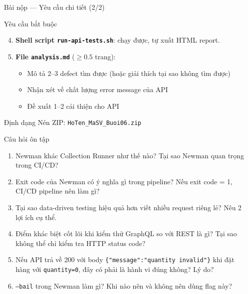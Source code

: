 \documentclass[aspectratio=169,10pt]{beamer}
\begin{document}
\begin{frame}{Bài nộp --- Yêu cầu chi tiết (2/2)}
  \begin{block}{Yêu cầu bắt buộc}
    \begin{enumerate}
      \setcounter{enumi}{3}
      \item \textbf{Shell script \texttt{run-api-tests.sh}}:
        chạy được, tự xuất HTML report.

      \item \textbf{File \texttt{analysis.md}} ($\geq 0.5$ trang):
        \begin{itemize}
          \item Mô tả 2--3 defect tìm được (hoặc giải thích tại sao không tìm được)
          \item Nhận xét về chất lượng error message của API
          \item Đề xuất 1--2 cải thiện cho API
        \end{itemize}
    \end{enumerate}
  \end{block}

  \begin{alertblock}{Định dạng}
    Nén ZIP: \texttt{HoTen\_MaSV\_Buoi06.zip}
  \end{alertblock}
\end{frame}

\begin{frame}{Câu hỏi ôn tập}
  \begin{enumerate}
    \item Newman khác Collection Runner như thế nào?
      Tại sao Newman quan trọng trong CI/CD?

    \item Exit code của Newman có ý nghĩa gì trong pipeline?
      Nếu exit code = 1, CI/CD pipeline nên làm gì?

    \item Tại sao data-driven testing hiệu quả hơn viết nhiều
      request riêng lẻ? Nêu 2 lợi ích cụ thể.

    \item Điểm khác biệt cốt lõi khi kiểm thử GraphQL so với REST
      là gì? Tại sao không thể chỉ kiểm tra HTTP status code?

    \item Nếu API trả về 200 với body \texttt{\{"message":"quantity invalid"\}}
      khi đặt hàng với \texttt{quantity=0}, đây có phải là hành vi đúng không?
      Lý do?

    \item \texttt{--bail} trong Newman làm gì? Khi nào nên và không nên
      dùng flag này?
  \end{enumerate}
\end{frame}
\end{document}
